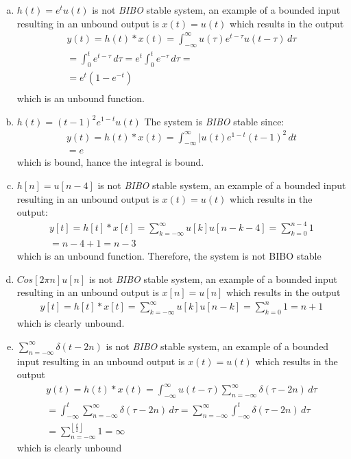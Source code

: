 \documentclass[10pt, letterpaper]{article}
\begin{document}
\begin{enumerate}[a.]
\item $h(t) = e^tu(t)$ is not \emph{BIBO} stable system, an example of a bounded input 
resulting in an unbound output is $x(t) = u(t)$ which results in the output
\begin{align*}
y(t) = h(t) * x(t) = 
\int_{-\infty}^{\infty} u(\tau)e^{t - \tau}u(t - \tau) \, d\tau \\
= \int_{0}^{t}e^{t - \tau} \, d\tau 
= e^t \int_{0}^{t}e^{-\tau} \, d\tau = \\
= \boxed{e^t (1 - e^{-t})}
\\
\end{align*}
which is an unbound function.

\item $h(t) = (t - 1)^2e^{1-t}u(t)$ The system is \emph{BIBO} stable since:
\begin{align*}
	y(t) = h(t) * x(t) = 
	\int_{-\infty}^{\infty} |u(t)e^{1 - t}(t - 1)^2 \, dt \\
	= e
\end{align*}
which is bound, hance the integral is bound.

\item $h[n] = u[n - 4]$ is not \emph{BIBO} stable system, an example of a bounded input 
resulting in an unbound output is $x(t) = u(t)$ which results in the output:
\begin{align*}
y[t] = h[t] * x[t] = 
\sum_{k = -\infty}^{\infty} u[k] u[n - k - 4] = \sum_{k = 0}^{n - 4} 1 \\
= n - 4 + 1 = \boxed{n - 3}
\end{align*}
which is an unbound function. Therefore, the system is not BIBO stable

\item $Cos[2\pi n] u[n]$ is not \emph{BIBO} stable system, an example of a bounded input 
resulting in an unbound output is $x[n]= u[n]$ which results in the output
\begin{align*}
y[t] = h[t] * x[t] = 
\sum_{k = -\infty}^{\infty} u[k] u[n - k] 
= \sum_{k = 0}^{n} 1 
= \boxed{n +1 }
\end{align*}
which is clearly unbound.

\item $\sum_{n = -\infty}^{\infty}\delta(t - 2n)$ is not \emph{BIBO} stable system, an example of a bounded input 
resulting in an unbound output is $x(t)= u(t)$ which results in the output
\begin{align*}
	y(t) = h(t) * x(t) = 
	\int_{-\infty}^{\infty} u(t - \tau)\sum_{n = -\infty}^{\infty} \delta(\tau - 2n) \, d\tau \\
	= \int_{-\infty}^{t} \sum_{n = -\infty}^{\infty} \delta(\tau - 2n) \, d\tau = 
	\sum_{n = -\infty}^{\infty}  \int_{-\infty}^{t} \delta(\tau - 2n) \, d\tau \\
	= \sum_{n = -\infty}^{\left \lfloor{\frac{t}{2}}\right \rfloor } 1 
	= \boxed{\infty}
\end{align*}
which is clearly unbound
\end{enumerate}
\end{document}
